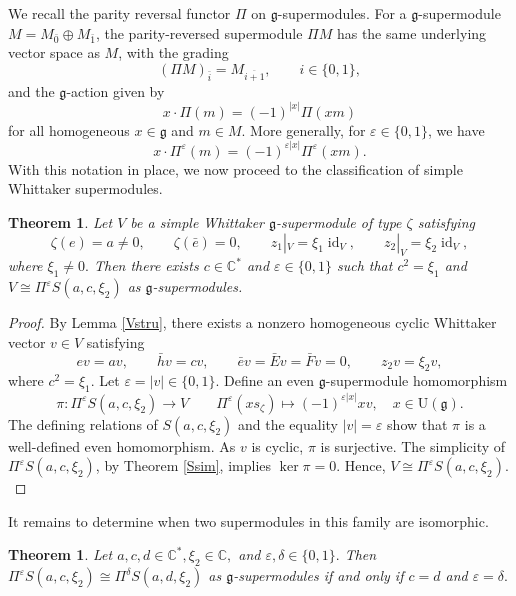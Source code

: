\documentclass[a4paper,10pt]{article}
\theoremstyle{definition}
\theoremstyle{plain}
\newtheorem{theorem}[definition]{Theorem}
\theoremstyle{remark}
\theoremstyle{mystyle}
\numberwithin{equation}{section}
\begin{document}
We recall the parity reversal functor \(\Pi\) on \(\mathfrak g\)-supermodules. For a \(\mathfrak g\)-supermodule \(M=M_{\bar0}\oplus M_{\bar1}\), the parity-reversed supermodule \(\Pi M\) has the same underlying vector space as \(M\), with the grading
\[
(\Pi M)_{\bar i}=M_{\overline{i+1}},
\qquad i\in\{0,1\},
\]
and the \(\mathfrak g\)-action given by
\[
x\cdot\Pi(m)=(-1)^{|x|}\Pi(xm)
\]
for all homogeneous \(x\in\mathfrak g\) and \(m\in M\). More generally, for \(\varepsilon\in\{0,1\}\), we have 
\[
x\cdot\Pi^\varepsilon(m)
=
(-1)^{\varepsilon|x|}
\Pi^\varepsilon(xm).
\]
With this notation in place, we now proceed to the classification of simple Whittaker supermodules.
\begin{theorem}\label{theo1}
    Let $V$ be a simple Whittaker $\mathfrak g$-supermodule of type $\zeta$ satisfying 
    $$
        \zeta(e)=a\neq0,\qquad\zeta(\bar e)=0,\qquad z_1|_V=\xi_1\operatorname{id}_V, \qquad z_2|_V=\xi_2\operatorname{id}_V,
    $$
    where $\xi_1\neq0.$ Then there exists \(c\in\mathbb C^*\) and $\varepsilon\in \{0,1\}$ such that $c^2=\xi_1$ and $V\cong \Pi^{\varepsilon}S(a,c,\xi_2)$ as $\mathfrak g$-supermodules.
\end{theorem}
\begin{proof}
    By Lemma \ref{Vstru}, there exists a nonzero homogeneous cyclic Whittaker vector \(v\in V\) satisfying 
    \[
    ev=av,\qquad \bar hv=cv,\qquad \bar ev=\bar Ev=\bar Fv=0,\qquad z_2v=\xi_2v,
    \]
    where $c^2=\xi_1.$ Let $\varepsilon=|v|\in\{0,1\}.$ Define an even $\mathfrak g$-supermodule homomorphism   
    $$
    \pi:\Pi^\varepsilon S(a,c,\xi_2)\to V\qquad \Pi^{\varepsilon}(xs_{\zeta})\mapsto (-1)^{\varepsilon |x|}xv,\quad x\in\mathrm{U}(\mathfrak{g}).
    $$
    The defining relations of \(S(a,c,\xi_2)\) and the equality \(|v|=\varepsilon\) show that \(\pi\) is a well-defined even homomorphism. As \(v\) is cyclic, \(\pi\) is surjective. The simplicity of $\Pi^{\varepsilon}S(a,c,\xi_2)$, by Theorem \ref{Ssim}, implies $\ker\pi=0.$ Hence, $V\cong\Pi^\varepsilon S(a,c,\xi_2).$
\end{proof}
It remains to determine when two supermodules in this family are isomorphic.
\begin{theorem}\label{3.17}
    Let $a,c,d\in\mathbb C^*,\xi_2\in\mathbb C,$ and $\varepsilon,\delta\in\{0,1\}.$ Then $\Pi^\varepsilon S(a,c,\xi_2)\cong\Pi^\delta S(a,d,\xi_2)$ as \(\mathfrak g\)-supermodules if and only if $c=d$ and $\varepsilon=\delta.$
\end{theorem}
\end{document}
